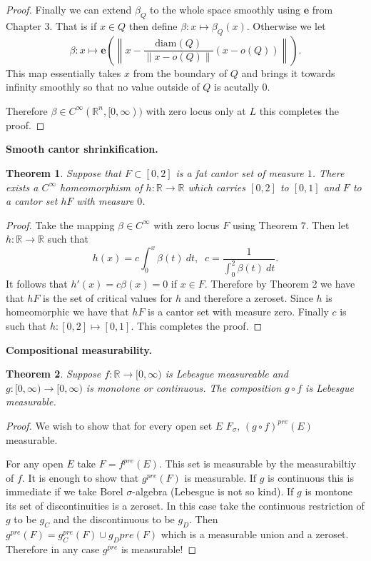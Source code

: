 \documentclass[letter]{article}
\newtheorem{theorem}{Theorem}
\newenvironment{menumerate}{%
  \edef\backupindent{\the\parindent}%
  \enumerate%
  \setlength{\parindent}{\backupindent}%
}{\endenumerate}
\begin{document}
\begin{menumerate}
\begin{proof}
		Finally we can extend $\beta_Q$ to the whole space smoothly using $\textbf{e}$ from Chapter $3$. That is if $x \in Q$ then define $\beta: x \mapsto \beta_Q(x).$ Otherwise we let
		\begin{equation}
			\beta: x \mapsto \textbf{e}\left(\left\|x - \frac{\text{diam}(Q)}{\|x - o(Q)\|}(x - o(Q))  \right\|\right).
		\end{equation}
		This map essentially takes $x$ from the boundary of $Q$ and brings it towards infinity smoothly so that no value outside of $Q$ is acutally $0$.

		Therefore $\beta \in C^\infty(\mathbb{R}^n, [0, \infty))$ with zero locus only at $L$ this completes the proof.
	\end{proof}
	\item \textbf{Smooth cantor shrinkification.}
	\begin{theorem}
		Suppose that $F \subset [0,2]$ is a fat cantor set of measure $1$. There exists a $C^\infty$ homeomorphism of $h: \mathbb{R} \to \mathbb{R}$ which carries $[0,2]$  to $[0,1]$ and $F$ to a cantor set $hF$ with measure $0$.
	\end{theorem}
	\begin{proof}
		Take the mapping $\beta \in C^\infty$ with zero locus $F$ using Theorem 7. Then let $h: \mathbb{R} \to \mathbb{R}$ such that
		\begin{equation}
			h(x) = c\int_0^x \beta(t)\ dt,\;\; c = \frac{1}{\int_0^2 \beta(t)\ dt}.
		 \end{equation} 
		 It follows that $h'(x) = c\beta(x) = 0$ if $x \in F$. Therefore by Theorem 2 we have that $hF$ is the set of critical values for $h$ and therefore a zeroset. Since $h$ is homeomorphic we have that $hF$ is a cantor set with measure zero. Finally $c$ is such that $h : [0,2] \mapsto [0,1].$ This completes the proof.
	\end{proof}
	\item \textbf{Compositional measurability.}
	\begin{theorem}
		Suppose $f: \mathbb{R} \to [0, \infty)$ is Lebesgue measureable and $g: [0, \infty) \to [0, \infty)$ is monotone or continuous. The composition $g \circ f$ is Lebesgue measurable.
	\end{theorem}
	\begin{proof}
		We wish to show that for every open set $E$  $F_\sigma$, $(g \circ f)^{pre}(E)$ measurable.

		For any open $E$ take $F = f^{pre}(E).$ This set is measurable by the measurabiltiy of $f.$ It is enough to show that $g^{pre}(F)$ is measurable. If $g$ is continuous this is immediate if we take Borel $\sigma$-algebra (Lebesgue is not so kind). If $g$ is montone its set of discontinuities is a zeroset. In this case take the continuous restriction of $g$ to be $g_C$ and the discontinuous to be $g_D$.
		Then
		 $g^{pre}(F) = g_C^{pre}(F) \cup g_D{pre}(F)$ which is a measurable union and a zeroset. Therefore in any case $g^{pre}$ is measurable!


\end{proof}
\end{menumerate}
\end{document}
